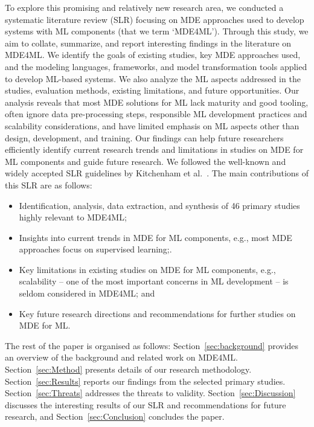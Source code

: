 To explore this promising and relatively new research area, we conducted a systematic literature review (SLR) focusing on MDE approaches used to develop systems with ML components (that we term `MDE4ML'). Through this study, we aim to collate, summarize, and report interesting findings in the literature on MDE4ML. We identify the goals of existing studies, key MDE approaches used, and the modeling languages, frameworks, and model transformation tools applied to develop ML-based systems. We also analyze the ML aspects addressed in the studies, evaluation methods, existing limitations, and future opportunities. Our analysis reveals that most MDE solutions for ML lack maturity and good tooling, often ignore data pre-processing steps, responsible ML development practices and scalability considerations, and have limited emphasis on ML aspects other than design, development, and training. Our findings can help future researchers efficiently identify current research trends and limitations in studies on MDE for ML components and guide future research. We followed the well-known and widely accepted SLR guidelines by Kitchenham et al.~\cite{kitchenham2009systematic, kitchenham2007guidelines}. The main contributions of this SLR are as follows:
\begin{itemize}
    \item Identification, analysis, data extraction, and synthesis of 46 primary studies highly relevant to MDE4ML;
    \item Insights into current trends in MDE for ML components, e.g., most MDE approaches focus on supervised learning;.
    \item Key limitations in existing studies on MDE for ML components, e.g., scalability -- one of the most important concerns in ML development -- is seldom considered in MDE4ML; and
    \item Key future research directions and recommendations for further studies on MDE for ML.
\end{itemize}

The rest of the paper is organised as follows: Section~\ref{sec:background} provides an overview of the background and related work on MDE4ML. Section~\ref{sec:Method} presents details of our research methodology. Section~\ref{sec:Results}
reports our findings from the selected primary studies. Section~\ref{sec:Threats} addresses the threats to validity. Section~\ref{sec:Discussion}  discusses the interesting results of our SLR and recommendations for future research, and Section~\ref{sec:Conclusion}  concludes the paper.


